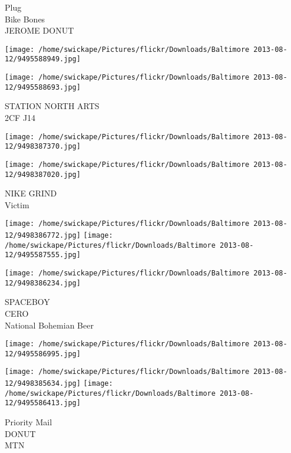\documentclass[10pt,letterpaper]{article}
\begin{document}
Plug\\
Bike Bones\\
JEROME DONUT\\
\pagebreak

\texttt{[image: /home/swickape/Pictures/flickr/Downloads/Baltimore 2013-08-12/9495588949.jpg]}

\vspace{0.25in}
\texttt{[image: /home/swickape/Pictures/flickr/Downloads/Baltimore 2013-08-12/9495588693.jpg]}

STATION NORTH ARTS\\
2CF J14\\
\pagebreak

\texttt{[image: /home/swickape/Pictures/flickr/Downloads/Baltimore 2013-08-12/9498387370.jpg]}

\vspace{0.25in}
\texttt{[image: /home/swickape/Pictures/flickr/Downloads/Baltimore 2013-08-12/9498387020.jpg]}

NIKE GRIND\\
Victim\\
\pagebreak

\texttt{[image: /home/swickape/Pictures/flickr/Downloads/Baltimore 2013-08-12/9498386772.jpg]}
\texttt{[image: /home/swickape/Pictures/flickr/Downloads/Baltimore 2013-08-12/9495587555.jpg]}

\vspace{0.25in}
\texttt{[image: /home/swickape/Pictures/flickr/Downloads/Baltimore 2013-08-12/9498386234.jpg]}

SPACEBOY\\
CERO\\
National Bohemian Beer\\
\pagebreak

\texttt{[image: /home/swickape/Pictures/flickr/Downloads/Baltimore 2013-08-12/9495586995.jpg]}

\vspace{0.25in}
\texttt{[image: /home/swickape/Pictures/flickr/Downloads/Baltimore 2013-08-12/9498385634.jpg]}
\texttt{[image: /home/swickape/Pictures/flickr/Downloads/Baltimore 2013-08-12/9495586413.jpg]}

Priority Mail\\
DONUT\\
MTN\\
\pagebreak
\end{document}
